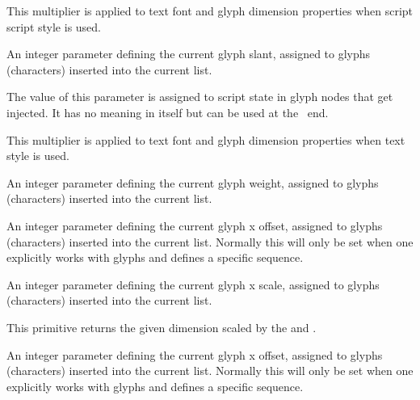 This multiplier is applied to text font and glyph dimension properties when
script script style is used.

\stopnewprimitive

\startnewprimitive[title={\prm {glyphslant}}]

An integer parameter defining the current glyph slant, assigned to glyphs
(characters) inserted into the current list.

\stopnewprimitive

\startnewprimitive[title={\prm {glyphstatefield}}]

The value of this parameter is assigned to script state in glyph nodes that get
injected. It has no meaning in itself but can be used at the \LUA\ end.

\stopnewprimitive

\startnewprimitive[title={\prm {glyphtextscale}}]

This multiplier is applied to text font and glyph dimension properties when text
style is used.

\stopnewprimitive

\startnewprimitive[title={\prm {glyphweight}}]

An integer parameter defining the current glyph weight, assigned to glyphs
(characters) inserted into the current list.

\stopnewprimitive

\startnewprimitive[title={\prm {glyphxoffset}}]

An integer parameter defining the current glyph x offset, assigned to glyphs
(characters) inserted into the current list. Normally this will only be set when
one explicitly works with glyphs and defines a specific sequence.

\stopnewprimitive

\startnewprimitive[title={\prm {glyphxscale}}]

An integer parameter defining the current glyph x scale, assigned to glyphs
(characters) inserted into the current list.

\stopnewprimitive

\startnewprimitive[title={\prm {glyphxscaled}}]

This primitive returns the given dimension scaled by the  and
.

\stopnewprimitive

\startnewprimitive[title={\prm {glyphyoffset}}]

An integer parameter defining the current glyph x offset, assigned to glyphs
(characters) inserted into the current list. Normally this will only be set when
one explicitly works with glyphs and defines a specific sequence.

